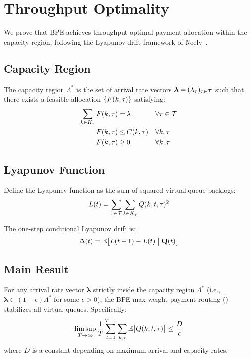 \section{Throughput Optimality}
\label{sec:throughput}

We prove that BPE achieves throughput-optimal payment allocation within the
capacity region, following the Lyapunov drift framework of
Neely~\cite{neely2010stochastic}.

\subsection{Capacity Region}

\begin{definition}
The capacity region $\Lambda^*$ is the set of arrival rate vectors
$\boldsymbol{\lambda} = (\lambda_\tau)_{\tau \in \mathcal{T}}$ such that
there exists a feasible allocation $\{F(k, \tau)\}$ satisfying:
\begin{align}
\sum_{k \in K_\tau} F(k, \tau) &= \lambda_\tau &&\forall \tau \in \mathcal{T} \\
F(k, \tau) &\leq \bar{C}(k, \tau) &&\forall k, \tau \\
F(k, \tau) &\geq 0 &&\forall k, \tau
\end{align}
\end{definition}

\subsection{Lyapunov Function}

Define the Lyapunov function as the sum of squared virtual queue backlogs:
\begin{equation}
L(t) = \sum_{\tau \in \mathcal{T}} \sum_{k \in K_\tau} Q(k, t, \tau)^2
\end{equation}

The one-step conditional Lyapunov drift is:
\begin{equation}
\Delta(t) = \mathbb{E}\bigl[L(t+1) - L(t) \;\big|\; \mathbf{Q}(t)\bigr]
\end{equation}

\subsection{Main Result}

\begin{theorem}
\label{thm:main}
For any arrival rate vector $\boldsymbol{\lambda}$ strictly inside the capacity
region $\Lambda^*$ (i.e., $\boldsymbol{\lambda} \in (1-\epsilon)\Lambda^*$ for
some $\epsilon > 0$), the BPE max-weight payment routing ()
stabilizes all virtual queues. Specifically:
\begin{equation}
\limsup_{T \to \infty} \frac{1}{T} \sum_{t=0}^{T-1} \sum_{k,\tau}
\mathbb{E}\bigl[Q(k, t, \tau)\bigr] \leq \frac{D}{\epsilon}
\end{equation}
where $D$ is a constant depending on maximum arrival and capacity rates.
\end{theorem}

